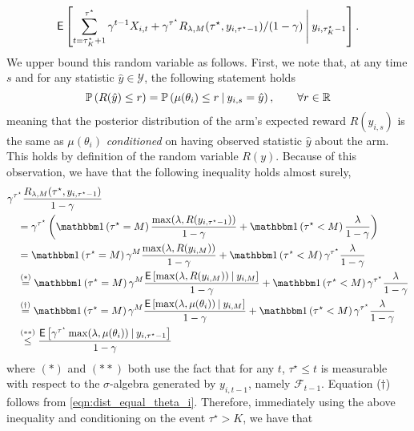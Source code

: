 \begin{myproof}[Proof.]
	\[
		\E\left[\sum_{t=\tau_K^\star+1}^{\tau^\star}  \gamma^{t-1} X_{i,t} + \gamma^{\tau^\star} R_{\lambda,M}(\tau^\star, y_{i,\tau^\star-1})/(1-\gamma)
	\given[\Bigg] y_{i,\tau_K^\star-1} \right].
	\]
	We upper bound this random variable as follows. First, we note that, at any time $s$ and for any statistic $\hat y \in \mathcal{Y}$, the following statement holds
	\begin{equation}\label{eqn:dist_equal_theta_i}
	\P{R(\hat y) \le r} = \P{\mu(\theta_i) \le r \given y_{i,s} = \hat y}, \qquad \forall r \in \Re
	\end{equation}
	meaning that the posterior distribution of the arm's expected reward $R(y_{i,s})$ is the same as $\mu(\theta_i)$ \emph{conditioned} on having observed statistic $\hat y$ about the arm. This holds by definition of the random variable $R(y)$. Because of this observation, we have that the following inequality  holds almost surely,
	\begin{align*}
		& \gamma^{\tau^\star} \frac{R_{\lambda,M}(\tau^\star, y_{i,\tau^\star-1})}{1-\gamma}
		 \nonumber \\
		&\quad =  \gamma^{\tau^\star}\left( \ind{\tau^\star =M}\frac{\max(\lambda, R(y_{i,\tau^\star-1}))}{1-\gamma} + \ind{\tau^\star < M}\frac{\lambda}{1-\gamma}\right)
		 \nonumber\\
		&\quad= \ind{\tau^\star =M} \gamma^{M}\frac{\max(\lambda, R(y_{i,M}))}{1-\gamma} + \ind{\tau^\star < M} \gamma^{\tau^\star}\frac{\lambda}{1-\gamma}
	\nonumber\\
		& \quad\overset{(*)}{=} \ind{\tau^\star =M} \gamma^{M}\frac{\Ee{\max(\lambda, R(y_{i,M})) \given y_{i,M} }}{1-\gamma} + \ind{\tau^\star < M} \gamma^{\tau^\star}\frac{\lambda}{1-\gamma}
		\\
		& \quad\overset{(\dagger)}{=} \ind{\tau^\star =M} \gamma^{M}\frac{\Ee{\max(\lambda, \mu(\theta_i)) \given y_{i,M} }}{1-\gamma} + \ind{\tau^\star < M} \gamma^{\tau^\star}\frac{\lambda}{1-\gamma}
		 \\
		&\quad \overset{(**)}{\le} \frac{  \Ee{\gamma^{\tau^\star}\max(\lambda, \mu(\theta_i)) \given y_{i,\tau^\star-1} }}{1-\gamma}
	\end{align*}
	where $(*)$ and $(**)$ both use the fact that for any $t$, $\tau^\star \le t$ is measurable with respect to the $\sigma$-algebra generated by $y_{i,t-1}$, namely $\mathcal F_{t-1}$. Equation ($\dagger$) follows from \eqref{eqn:dist_equal_theta_i}. Therefore, immediately using the above inequality and conditioning on the event $\tau^\star > K$, we have that
	\begin{align} 

\end{align}
\end{myproof}
